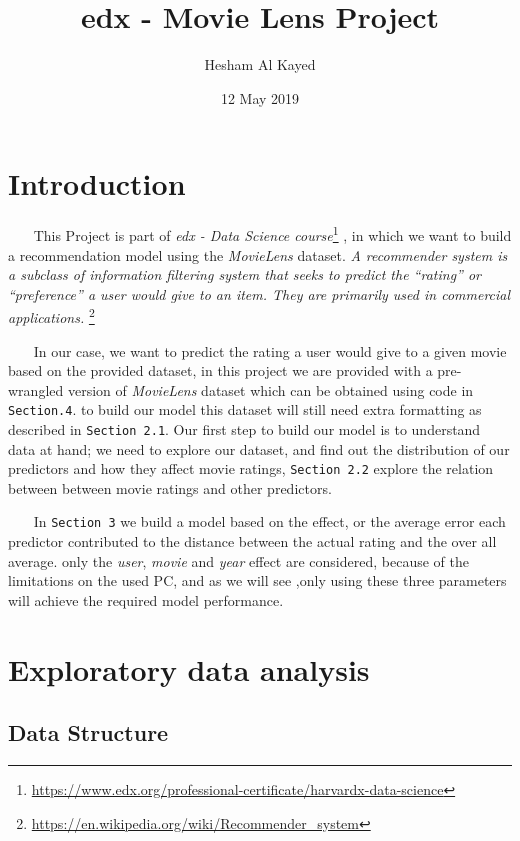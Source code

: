 \documentclass[]{article}
\title{edx - Movie Lens Project}
\author{Hesham Al Kayed}
\date{12 May 2019}
\let\rmarkdownfootnote\footnote%
\def\footnote{\protect\rmarkdownfootnote}
\begin{document}
\maketitle

\section{Introduction}\label{introduction}

~~~ This Project is part of \emph{edx - Data Science course}\footnote{\url{https://www.edx.org/professional-certificate/harvardx-data-science}}
, in which we want to build a recommendation model using the
\emph{MovieLens} dataset. \emph{A recommender system is a subclass of
information filtering system that seeks to predict the ``rating'' or
``preference'' a user would give to an item. They are primarily used in
commercial applications.} \footnote{\url{https://en.wikipedia.org/wiki/Recommender_system}}

~~~ In our case, we want to predict the rating a user would give to a
given movie based on the provided dataset, in this project we are
provided with a pre-wrangled version of \emph{MovieLens} dataset which
can be obtained using code in \texttt{Section.4}. to build our model
this dataset will still need extra formatting as described in
\texttt{Section\ 2.1}. Our first step to build our model is to
understand data at hand; we need to explore our dataset, and find out
the distribution of our predictors and how they affect movie ratings,
\texttt{Section\ 2.2} explore the relation between between movie ratings
and other predictors.

~~~ In \texttt{Section\ 3} we build a model based on the effect, or the
average error each predictor contributed to the distance between the
actual rating and the over all average. only the \emph{user},
\emph{movie} and \emph{year} effect are considered, because of the
limitations on the used PC, and as we will see ,only using these three
parameters will achieve the required model performance.

\section{Exploratory data analysis}\label{exploratory-data-analysis}

\subsection{Data Structure}\label{data-structure}
\end{document}
